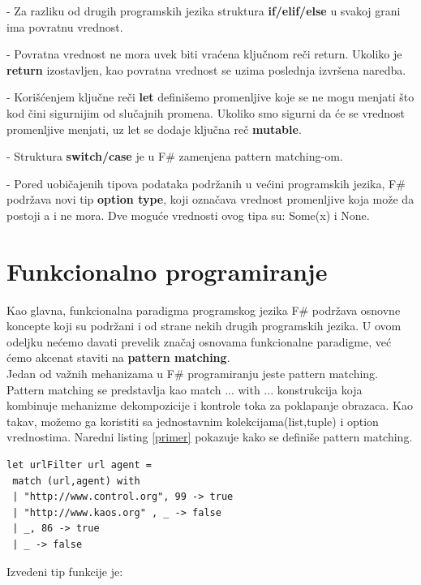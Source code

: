 \documentclass[a4paper]{article}
\begin{document}
	- Za razliku od drugih programskih jezika struktura \textbf{if/elif/else} u svakoj grani ima povratnu vrednost.
	 
	- Povratna vrednost ne mora uvek biti vraćena ključnom reči return. Ukoliko je \textbf{return} izostavljen, kao povratna vrednost se uzima poslednja izvršena naredba.
	 
	- Korišćenjem ključne reči \textbf{let} definišemo promenljive koje se ne mogu menjati što kod čini sigurnijim od slučajnih promena. Ukoliko smo sigurni da će se vrednost promenljive menjati, uz let se dodaje ključna reč \textbf{mutable}.
	 
	- Struktura \textbf{switch/case} je u F\# zamenjena pattern matching-om\cite{expertFS}.
	 
	- Pored uobičajenih tipova podataka podržanih u većini programskih jezika, F\# podržava novi tip \textbf{option type}, koji označava vrednost promenljive koja može da postoji a i ne mora. Dve moguće vrednosti ovog tipa su: Some(x) i None.

\section{Funkcionalno programiranje}



Kao glavna, funkcionalna paradigma programskog jezika F\# podržava osnovne koncepte koji su podržani i od strane nekih drugih programskih jezika. U ovom odeljku nećemo davati prevelik značaj osnovama funkcionalne paradigme, već ćemo akcenat staviti na \textbf{pattern matching}\cite{expertFS}.\\

Jedan od važnih mehanizama u F\# programiranju jeste pattern matching. Pattern matching se predstavlja kao match ... with ... konstrukcija koja kombinuje mehanizme dekompozicije i kontrole toka za poklapanje obrazaca. Kao takav, možemo ga koristiti sa  jednostavnim kolekcijama(list,tuple) i option vrednostima. Naredni listing \ref{primer} pokazuje kako se definiše pattern matching.
\\
\begin{lstlisting}[caption={Primer pattern matching-a\cite{expertFS}},frame=single, label=primer]
let urlFilter url agent =
 match (url,agent) with
 | "http://www.control.org", 99 -> true
 | "http://www.kaos.org" , _ -> false
 | _, 86 -> true
 | _ -> false
\end{lstlisting} 

Izvedeni tip funkcije je:
\end{document}
